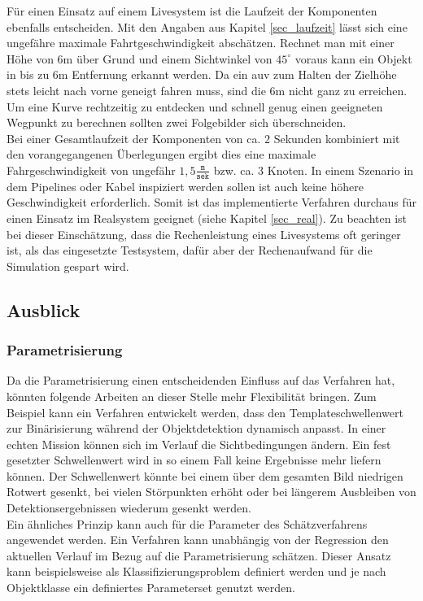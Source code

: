 Für einen Einsatz auf einem Livesystem ist die Laufzeit der Komponenten ebenfalls entscheiden. Mit den Angaben aus Kapitel \ref{sec_laufzeit} lässt sich eine ungefähre maximale Fahrtgeschwindigkeit abschätzen. Rechnet man mit einer Höhe von $6$m über Grund und einem Sichtwinkel von $45^\circ$ voraus kann ein Objekt in bis zu $6$m Entfernung erkannt werden. Da ein \gls{auv} zum Halten der Zielhöhe stets leicht nach vorne geneigt fahren muss, sind die $6$m nicht ganz zu erreichen. Um eine Kurve rechtzeitig zu entdecken und schnell genug einen geeigneten Wegpunkt zu berechnen sollten zwei Folgebilder sich überschneiden.\\
Bei einer Gesamtlaufzeit der Komponenten von ca. $2$ Sekunden kombiniert mit den vorangegangenen Überlegungen ergibt dies eine maximale Fahrgeschwindigkeit von ungefähr $1,5 \frac{\texttt{m}}{\texttt{sek}}$ bzw. ca. $3$ Knoten. In einem Szenario in dem Pipelines oder Kabel inspiziert werden sollen ist auch keine höhere Geschwindigkeit erforderlich. Somit ist das implementierte Verfahren durchaus für einen Einsatz im Realsystem geeignet (siehe Kapitel \ref{sec_real}). Zu beachten ist bei dieser Einschätzung, dass die Rechenleistung eines Livesystems oft geringer ist, als das eingesetzte Testsystem, dafür aber der Rechenaufwand für die Simulation gespart wird.

\subsection{Ausblick}

\subsubsection{Parametrisierung}
Da die Parametrisierung einen entscheidenden Einfluss auf das Verfahren hat, könnten folgende Arbeiten an dieser Stelle mehr Flexibilität bringen. Zum Beispiel kann ein Verfahren entwickelt werden, dass den Templateschwellenwert zur Binärisierung während der Objektdetektion dynamisch anpasst. In einer echten Mission können sich im Verlauf die Sichtbedingungen ändern. Ein fest gesetzter Schwellenwert wird in so einem Fall keine Ergebnisse mehr liefern können. Der Schwellenwert könnte bei einem über dem gesamten Bild niedrigen Rotwert gesenkt, bei vielen Störpunkten erhöht oder bei längerem Ausbleiben von Detektionsergebnissen wiederum gesenkt werden.\\

Ein ähnliches Prinzip kann auch für die Parameter des Schätzverfahrens angewendet werden. Ein Verfahren kann unabhängig von der Regression den aktuellen Verlauf im Bezug auf die Parametrisierung schätzen. Dieser Ansatz kann beispielsweise als Klassifizierungsproblem definiert werden und je nach Objektklasse ein definiertes Parameterset genutzt werden.

